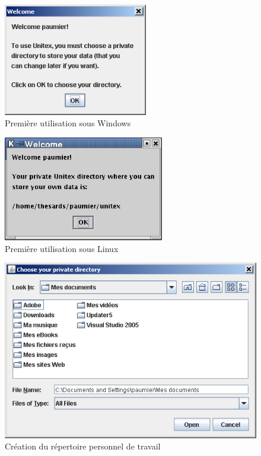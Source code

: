 \begin{figure}[!ht]
\begin{center}
\includegraphics[width=6.3cm]{resources/img/fig1-1.png}
\caption{Première utilisation sous Windows}
\end{center}
\end{figure}

\begin{figure}[!ht]
\begin{center}
\includegraphics[width=7cm]{resources/img/fig1-2.png}
\caption{Première utilisation sous Linux}
\end{center}
\end{figure}

\begin{figure}[!ht]
\begin{center}
\includegraphics[width=13cm]{resources/img/fig1-3.png}
\caption{Création du répertoire personnel de travail
\label{fig-creation-personal-directory}}
\end{center}
\end{figure}




